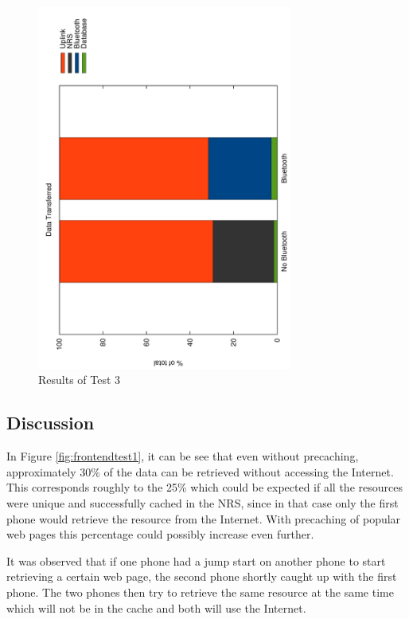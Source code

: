 \begin{figure}
	\centering
		\includegraphics[width=0.75\textwidth, angle=-90]{./img/bt.pdf}
    	\caption{Results of Test 3}
	\label{fig:frontendtest3}
\end{figure}

\subsection{Discussion}

In Figure \ref{fig:frontendtest1}, it can be see that even without precaching, approximately 30\% of the data can be retrieved without accessing the Internet. This corresponds roughly to the 25\% which could be expected if all the resources were unique and successfully cached in the NRS, since in that case only the first phone would retrieve the resource from the Internet. With precaching of popular web pages this percentage could possibly increase even further.

It was observed that if one phone had a jump start on another phone to start retrieving a certain web page, the second phone shortly caught up with the first phone. The two phones then try to retrieve the same resource at the same time which will not be in the cache and both will use the Internet.

